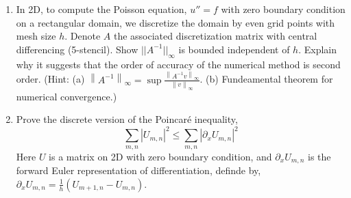 \documentclass{article}
\begin{document}
\begin{enumerate}
	\item In 2D, to compute the Poisson equation, $u'' = f$
		with zero boundary condition on a rectangular domain,
		we discretize the domain by even grid points with mesh size $h$.
		Denote $A$ the associated discretization matrix with central differencing (5-stencil).
		Show $||A^{-1}||_\infty$ is bounded independent of $h$.
		Explain why it suggests that the order of accuracy of the numerical method is second order.
		(Hint:
			(a) $\left\|A^{-1}\right\|_\infty =
				\displaystyle\sup\frac{\left\|A^{-1}v\right\|_\infty}{\left\|v\right\|_\infty}$.
			(b) Fundeamental theorem for numerical convergence.)

	\item Prove the discrete version of the Poincar\'e inequality,
		\begin{equation*}
			\sum_{m,n}\left|U_{m,n}\right|^2 \leq \sum_{m,n}\left|\partial_x U_{m,n}\right|^2
		\end{equation*}
		Here $U$ is a matrix on 2D with zero boundary condition,
		and $\partial_x U_{m,n}$ is the forward Euler representation of differentiation,
		definde by, $\partial_x U_{m,n} = \frac{1}{h}\left(U_{m+1,n} - U_{m,n}\right)$.
\end{enumerate}
\end{document}
